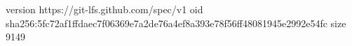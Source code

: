 version https://git-lfs.github.com/spec/v1
oid sha256:5fc72af1ffdaec7f06369e7a2de76a4ef8a393e78f56ff48081945e2992e54fc
size 9149
